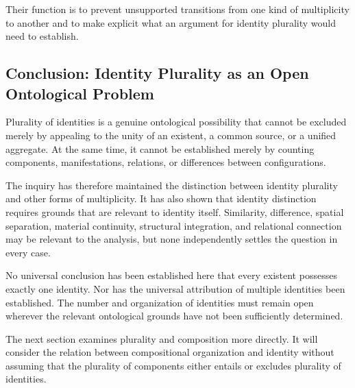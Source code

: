Their function is to prevent unsupported transitions
from one kind of multiplicity to another and to make
explicit what an argument for identity plurality would
need to establish.

\subsection{Conclusion: Identity Plurality as an Open Ontological Problem}

Plurality of identities is a genuine ontological possibility
that cannot be excluded merely by appealing to the unity
of an existent, a common source, or a unified aggregate.
At the same time, it cannot be established merely by
counting components, manifestations, relations, or
differences between configurations.

The inquiry has therefore maintained the distinction
between identity plurality and other forms of multiplicity.
It has also shown that identity distinction requires
grounds that are relevant to identity itself. Similarity,
difference, spatial separation, material continuity,
structural integration, and relational connection may
be relevant to the analysis, but none independently
settles the question in every case.

No universal conclusion has been established here
that every existent possesses exactly one identity.
Nor has the universal attribution of multiple identities
been established. The number and organization of identities
must remain open wherever the relevant ontological
grounds have not been sufficiently determined.

The next section examines plurality and composition
more directly. It will consider the relation between
compositional organization and identity without assuming
that the plurality of components either entails or
excludes plurality of identities.

